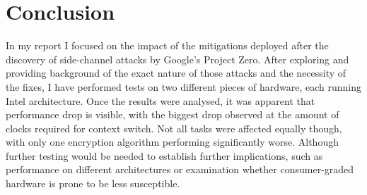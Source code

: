 \documentclass{csfourzero}
\begin{document}
\section{Conclusion}
\label{sec:conc}

In my report I focused on the impact of the mitigations deployed after the discovery of side-channel attacks by Google's Project Zero. After exploring and providing background of the exact nature of those attacks and the necessity of the fixes, I have performed tests on two different pieces of hardware, each running Intel architecture. Once the results were analysed, it was apparent that performance drop is visible, with the biggest drop observed at the amount of clocks required for context switch. Not all tasks were affected equally though, with only one encryption algorithm performing significantly worse. Although further testing would be needed to establish further implications, such as performance on different architectures or examination whether consumer-graded hardware is prone to be less susceptible. 


\end{document}
